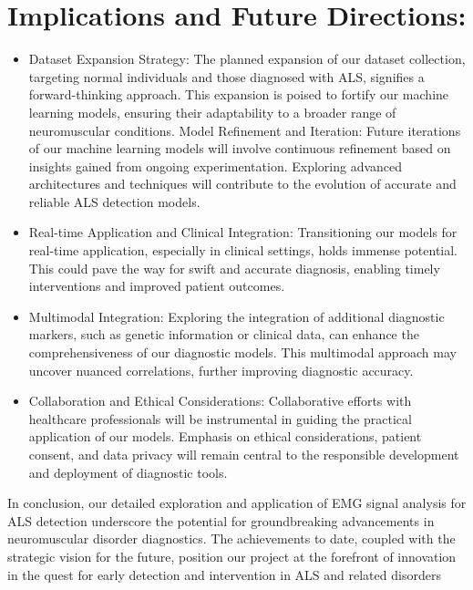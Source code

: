 \documentclass[ 12pt,a4paper,twocolumn,fleqn]{report}
\begin{document}
\section{Implications and Future Directions:}
\vspace{2mm}
\begin{itemize}
    \item Dataset Expansion Strategy: The planned expansion of our dataset collection, targeting normal
individuals and those diagnosed with ALS, signifies a forward-thinking approach. This
expansion is poised to fortify our machine learning models, ensuring their adaptability to a
broader range of neuromuscular conditions.
Model Refinement and Iteration: Future iterations of our machine learning models will involve
continuous refinement based on insights gained from ongoing experimentation. Exploring
advanced architectures and techniques will contribute to the evolution of accurate and reliable
ALS detection models.
\item Real-time Application and Clinical Integration: Transitioning our models for real-time
application, especially in clinical settings, holds immense potential. This could pave the way
for swift and accurate diagnosis, enabling timely interventions and improved patient outcomes.

\item Multimodal Integration: Exploring the integration of additional diagnostic markers, such as
genetic information or clinical data, can enhance the comprehensiveness of our diagnostic
models. This multimodal approach may uncover nuanced correlations, further improving
diagnostic accuracy.
\item Collaboration and Ethical Considerations: Collaborative efforts with healthcare professionals
will be instrumental in guiding the practical application of our models. Emphasis on ethical
considerations, patient consent, and data privacy will remain central to the responsible
development and deployment of diagnostic tools.
\end{itemize}

\vspace{2mm}
In conclusion, our detailed exploration and application of EMG signal analysis for ALS detection
underscore the potential for groundbreaking advancements in neuromuscular disorder diagnostics. The
achievements to date, coupled with the strategic vision for the future, position our project at the
forefront of innovation in the quest for early detection and intervention in ALS and related disorders
\newpage
  \pagestyle{fancy}
\thisfancypage{%
  \setlength{\fboxsep}{20pt}\doublebox}{}
\normalsize
\end{document}

